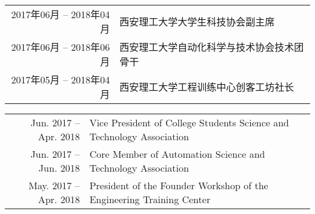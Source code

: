 \ifzh
    \begin{table}[!htbp]
        \begin{tabular}{rl}
            2017年06月 -- 2018年04月 & 西安理工大学大学生科技协会副主席      \\
            2017年06月 -- 2018年06月 & 西安理工大学自动化科学与技术协会技术团骨干 \\
            2017年05月 -- 2018年04月 & 西安理工大学工程训练中心创客工坊社长    \\
        \end{tabular}
    \end{table}
\else
    \begin{table}[!htbp]
        \begin{tabular}{rl}
            Jun. 2017 -- Apr. 2018 & Vice President of College Students Science and Technology Association \\
            Jun. 2017 -- Jun. 2018 & Core Member of Automation Science and Technology Association          \\
            May. 2017 -- Apr. 2018 & President of the Founder Workshop of the Engineering Training Center  \\
        \end{tabular}
    \end{table}
\fi